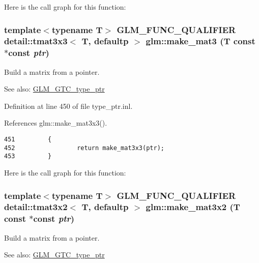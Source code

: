 Here is the call graph for this function:\hypertarget{group__gtc__type__ptr_g63c04b2cd2367a06e9817a66b5025662}{
\subsubsection[make\_\-mat3]{\setlength{\rightskip}{0pt plus 5cm}template$<$typename T$>$ GLM\_\-FUNC\_\-QUALIFIER detail::tmat3x3$<$ T, defaultp $>$ glm::make\_\-mat3 (T const $\ast$const  {\em ptr})}}
\label{group__gtc__type__ptr_g63c04b2cd2367a06e9817a66b5025662}


Build a matrix from a pointer. \begin{Desc}
\item[See also:]\hyperlink{group__gtc__type__ptr}{GLM\_\-GTC\_\-type\_\-ptr} \end{Desc}


Definition at line 450 of file type\_\-ptr.inl.

References glm::make\_\-mat3x3().

\begin{Code}\begin{verbatim}451         {
452                 return make_mat3x3(ptr);
453         }
\end{verbatim}
\end{Code}




Here is the call graph for this function:\hypertarget{group__gtc__type__ptr_g6c7d94e71f8df512fca44427311baeae}{
\subsubsection[make\_\-mat3x2]{\setlength{\rightskip}{0pt plus 5cm}template$<$typename T$>$ GLM\_\-FUNC\_\-QUALIFIER detail::tmat3x2$<$ T, defaultp $>$ glm::make\_\-mat3x2 (T const $\ast$const  {\em ptr})}}
\label{group__gtc__type__ptr_g6c7d94e71f8df512fca44427311baeae}


Build a matrix from a pointer. \begin{Desc}
\item[See also:]\hyperlink{group__gtc__type__ptr}{GLM\_\-GTC\_\-type\_\-ptr} \end{Desc}


